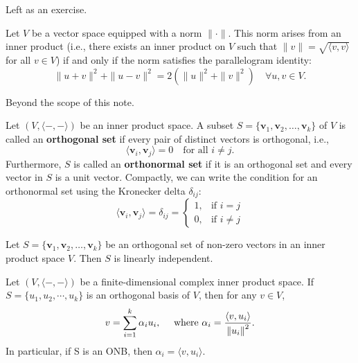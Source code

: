 \begin{pfbox}
    Left as an exercise.
\end{pfbox}

\begin{theorem}
    Let $V$ be a vector space equipped with a norm $\|\cdot\|$. 
    This norm arises from an inner product (i.e., there exists an inner product on $V$ such that $\|v\| = \sqrt{\langle v,v\rangle}$ for all $v\in V$) if and only if the norm satisfies the parallelogram identity:
    $$ \|u+v\|^2 + \|u-v\|^2 = 2(\|u\|^2 + \|v\|^2) \quad \forall u,v\in V. $$
\end{theorem}

\begin{pfbox}
    Beyond the scope of this note.
\end{pfbox}

\begin{definition}
    Let $(V,\langle-,-\rangle)$ be an inner product space. A subset $S = \{\mathbf{v}_1, \mathbf{v}_2, \dots, \mathbf{v}_k\}$ of $V$ is called an \textbf{orthogonal set} if every pair of distinct vectors is orthogonal, i.e.,
    $$ \langle \mathbf{v}_i, \mathbf{v}_j \rangle = 0 \quad \text{for all } i \neq j. $$
    Furthermore, $S$ is called an \textbf{orthonormal set} if it is an orthogonal set and every vector in $S$ is a unit vector. Compactly, we can write the condition for an orthonormal set using the Kronecker delta $\delta_{ij}$:
    $$ \langle \mathbf{v}_i, \mathbf{v}_j \rangle = \delta_{ij} = \begin{cases} 1, & \text{if } i = j \\ 0, & \text{if } i \neq j \end{cases} $$
\end{definition}

\begin{theorem}
    Let $S = \{\mathbf{v}_1, \mathbf{v}_2, \dots, \mathbf{v}_k\}$ be an orthogonal set of non-zero vectors in an inner product space $V$. Then $S$ is linearly independent.
\end{theorem}

\begin{theorem}
Let $(V,\langle-,-\rangle)$ be a finite-dimensional complex inner product space.
If $S=\{u_1,u_2,\cdots,u_k\}$ is an orthogonal basis of $V$, then for any $v\in V$,
$$v=\sum_{i=1}^{k}\alpha_i u_i, \quad \text{ where } \alpha_i=\frac{\langle v, u_i\rangle}{\left\lVert u_i \right\rVert^2}.$$
In particular, if S is an ONB, then $\alpha_i=\langle v, u_i\rangle.$
\end{theorem}

